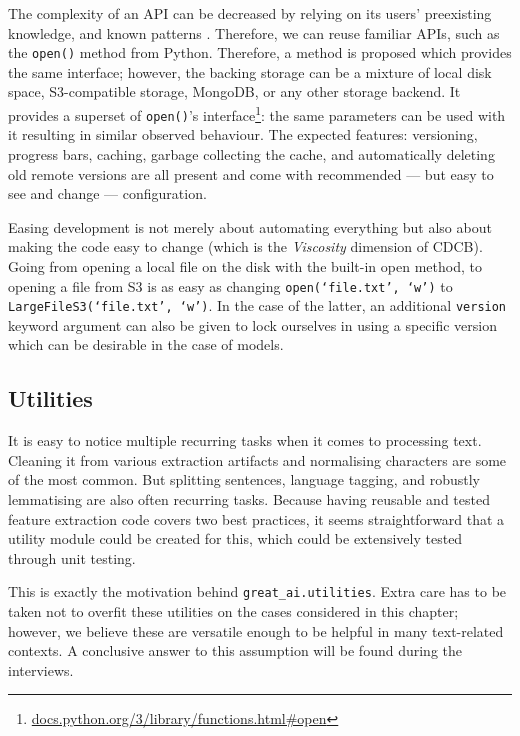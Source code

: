 The complexity of an API can be decreased by relying on its users' preexisting knowledge, and known patterns \cite{hermans2021programmer,ousterhout2018philosophy}. Therefore, we can reuse familiar APIs, such as the \texttt{open()} method from Python. Therefore, a method is proposed which provides the same interface; however, the backing storage can be a mixture of local disk space, S3-compatible storage, MongoDB, or any other storage backend. It provides a superset of \texttt{open()}'s interface\footnote{\href{https://docs.python.org/3/library/functions.html\#open}{docs.python.org/3/library/functions.html\#open}}: the same parameters can be used with it resulting in similar observed behaviour. The expected features: versioning, progress bars, caching, garbage collecting the cache, and automatically deleting old remote versions are all present and come with recommended --- but easy to see and change --- configuration.

Easing development is not merely about automating everything but also about making the code easy to change (which is the \textit{Viscosity} dimension of CDCB). Going from opening a local file on the disk with the built-in open method, to opening a file from S3 is as easy as changing \texttt{open(`file.txt', `w')} to \texttt{LargeFileS3(`file.txt', `w')}. In the case of the latter, an additional \texttt{version} keyword argument can also be given to lock ourselves in using a specific version which can be desirable in the case of models.

\subsection{Utilities}

It is easy to notice multiple recurring tasks when it comes to processing text. Cleaning it from various extraction artifacts and normalising characters are some of the most common. But splitting sentences, language tagging, and robustly lemmatising are also often recurring tasks. Because having reusable and tested feature extraction code covers two best practices, it seems straightforward that a utility module could be created for this, which could be extensively tested through unit testing.

This is exactly the motivation behind \texttt{great\_ai.utilities}. Extra care has to be taken not to overfit these utilities on the cases considered in this chapter; however, we believe these are versatile enough to be helpful in many text-related contexts. A conclusive answer to this assumption will be found during the interviews.

